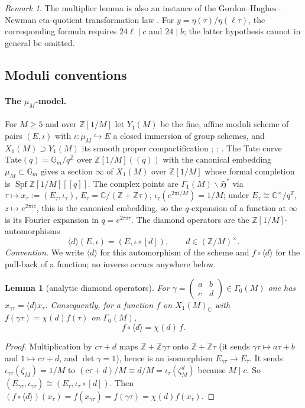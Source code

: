 \documentclass[11pt,a4paper]{article}
\numberwithin{equation}{section}
\newtheorem{lemma}[theorem]{Lemma}
\theoremstyle{definition}
\theoremstyle{remark}
\newtheorem{remark}[theorem]{Remark}
\newcommand{\Z}{\mathbb Z}
\begin{document}
\begin{remark}
The multiplier lemma is also an instance of the Gordon--Hughes--Newman
eta-quotient transformation law \citep[Theorem~1.64]{Ono04}.
For $y=\eta(\tau)/\eta(\ell\tau)$, the corresponding formula requires
$24\ell\mid c$ and $24\mid b$; the latter hypothesis cannot in general be omitted.
\end{remark}

\subsection{Moduli conventions}\label{subsec:moduli}

\paragraph{The $\mu_M$-model.} For $M\ge5$ and over $\Z[1/M]$ let $Y_1(M)$ be the fine, affine moduli
scheme of pairs $(E,\iota)$ with $\iota:\mu_M\hookrightarrow E$ a closed immersion of group schemes,
and $X_1(M)\supset Y_1(M)$ its smooth proper compactification
\citep[IV--V]{DR73}; \citep[\S2]{Gross90}; \citep[\S1]{Katz76}. The Tate curve
$\mathrm{Tate}(q)=\mathbb G_m/q^{\Z}$ over $\Z[1/M]((q))$ with the canonical embedding
$\mu_M\subset\mathbb G_m$ gives a section $\infty$ of $X_1(M)$ over $\Z[1/M]$ whose formal
completion is $\operatorname{Spf}\Z[1/M][[q]]$. The complex points are $\Gamma_1(M)\backslash\mathfrak H^*$
via $\tau\mapsto x_\tau:=(E_\tau,\iota_\tau)$, $E_\tau=\mathbb C/(\Z+\Z\tau)$,
$\iota_\tau(e^{2\pi i/M})=1/M$; under $E_\tau\cong\mathbb C^\times/q^\Z$, $z\mapsto e^{2\pi iz}$,
this is the canonical embedding, so the $q$-expansion of a function at $\infty$ is its Fourier
expansion in $q=e^{2\pi i\tau}$. The diamond operators are the $\Z[1/M]$-automorphisms
\[
\langle d\rangle(E,\iota)=(E,\iota\circ[d]),\qquad d\in(\Z/M)^\times .
\]
\emph{Convention.} We write $\langle d\rangle$ for this automorphism of the scheme and
$f\circ\langle d\rangle$ for the pull-back of a function; no inverse occurs anywhere below.

\begin{lemma}[analytic diamond operators]\label{lem:diamond}
For $\gamma=\begin{pmatrix}a&b\\c&d\end{pmatrix}\in\Gamma_0(M)$ one has
$x_{\gamma\tau}=\langle d\rangle x_\tau$. Consequently, for a function $f$ on $X_1(M)_{\mathbb C}$
with $f(\gamma\tau)=\chi(d)f(\tau)$ on $\Gamma_0(M)$,
\[
f\circ\langle d\rangle=\chi(d)\,f .
\]
\end{lemma}
\begin{proof}
Multiplication by $c\tau+d$ maps $\Z+\Z\gamma\tau$ onto $\Z+\Z\tau$ (it sends $\gamma\tau\mapsto a\tau+b$
and $1\mapsto c\tau+d$, and $\det\gamma=1$), hence is an isomorphism $E_{\gamma\tau}\to E_\tau$. It
sends $\iota_{\gamma\tau}(\zeta_M)=1/M$ to $(c\tau+d)/M\equiv d/M=\iota_\tau(\zeta_M^d)$ because
$M\mid c$. So $(E_{\gamma\tau},\iota_{\gamma\tau})\cong(E_\tau,\iota_\tau\circ[d])$. Then
$(f\circ\langle d\rangle)(x_\tau)=f(x_{\gamma\tau})=f(\gamma\tau)=\chi(d)f(x_\tau)$.
\end{proof}
\end{document}
